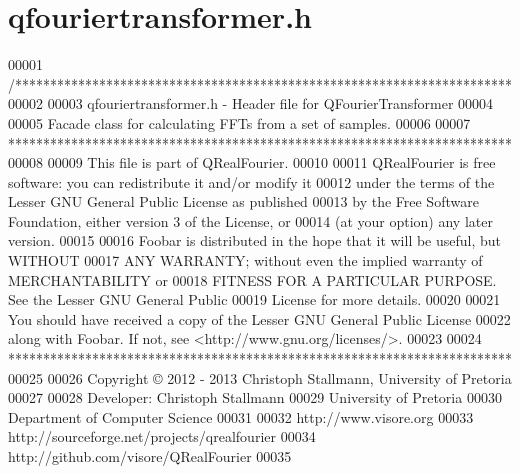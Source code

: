 \hypertarget{a00122_source}{\section{qfouriertransformer.\+h}
\label{a00122_source}
}

\begin{DoxyCode}
00001 \textcolor{comment}{/***********************************************************************}
00002 \textcolor{comment}{}
00003 \textcolor{comment}{qfouriertransformer.h - Header file for QFourierTransformer}
00004 \textcolor{comment}{}
00005 \textcolor{comment}{Facade class for calculating FFTs from a set of samples.}
00006 \textcolor{comment}{}
00007 \textcolor{comment}{************************************************************************}
00008 \textcolor{comment}{}
00009 \textcolor{comment}{This file is part of QRealFourier.}
00010 \textcolor{comment}{}
00011 \textcolor{comment}{QRealFourier is free software: you can redistribute it and/or modify it}
00012 \textcolor{comment}{under the terms of the Lesser GNU General Public License as published}
00013 \textcolor{comment}{by the Free Software Foundation, either version 3 of the License, or}
00014 \textcolor{comment}{(at your option) any later version.}
00015 \textcolor{comment}{}
00016 \textcolor{comment}{Foobar is distributed in the hope that it will be useful, but WITHOUT}
00017 \textcolor{comment}{ANY WARRANTY; without even the implied warranty of MERCHANTABILITY or}
00018 \textcolor{comment}{FITNESS FOR A PARTICULAR PURPOSE.  See the Lesser GNU General Public}
00019 \textcolor{comment}{License for more details.}
00020 \textcolor{comment}{}
00021 \textcolor{comment}{You should have received a copy of the Lesser GNU General Public License}
00022 \textcolor{comment}{along with Foobar.  If not, see <http://www.gnu.org/licenses/>.}
00023 \textcolor{comment}{}
00024 \textcolor{comment}{************************************************************************}
00025 \textcolor{comment}{}
00026 \textcolor{comment}{Copyright © 2012 - 2013 Christoph Stallmann, University of Pretoria}
00027 \textcolor{comment}{}
00028 \textcolor{comment}{Developer: Christoph Stallmann}
00029 \textcolor{comment}{University of Pretoria}
00030 \textcolor{comment}{Department of Computer Science}
00031 \textcolor{comment}{}
00032 \textcolor{comment}{http://www.visore.org}
00033 \textcolor{comment}{http://sourceforge.net/projects/qrealfourier}
00034 \textcolor{comment}{http://github.com/visore/QRealFourier}
00035 \textcolor{comment}{}

\end{DoxyCode}
